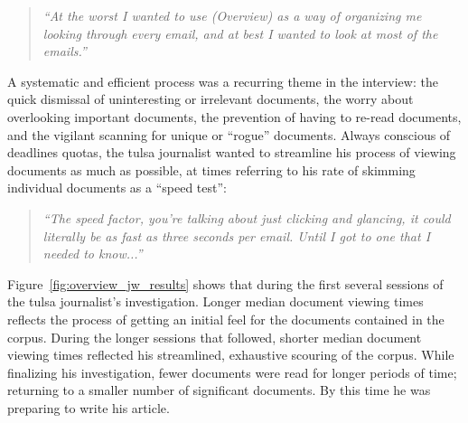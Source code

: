 \begin{quote} 
    {\it ``At the worst I wanted to use (Overview) as a way of organizing me looking through every email, and at best I wanted to look at most of the emails.''}
\end{quote}

A systematic and efficient process was a recurring theme in the interview: the quick dismissal of uninteresting or irrelevant documents, the worry about overlooking important documents, the prevention of having to re-read documents, and the vigilant scanning for unique or ``rogue'' documents. 
Always conscious of deadlines quotas, the {\sc tulsa} journalist wanted to streamline his process of viewing documents as much as possible, at times referring to his rate of skimming individual documents as a ``speed test'':

\begin{quote}
    {\it ``The speed factor, you're talking about just clicking and glancing, it could literally be as fast as three seconds per email. Until I got to one that I needed to know...''}
\end{quote}  

Figure~\ref{fig:overview_jw_results} shows that during the first several sessions of the {\sc tulsa} journalist's investigation.
Longer median document viewing times reflects the process of getting an initial feel for the documents contained in the corpus.
During the longer sessions that followed, shorter median document viewing times reflected his streamlined, exhaustive scouring of the corpus. 
While finalizing his investigation, fewer documents were read for longer periods of time; returning to a smaller number of significant documents. 
By this time he was preparing to write his article.  


